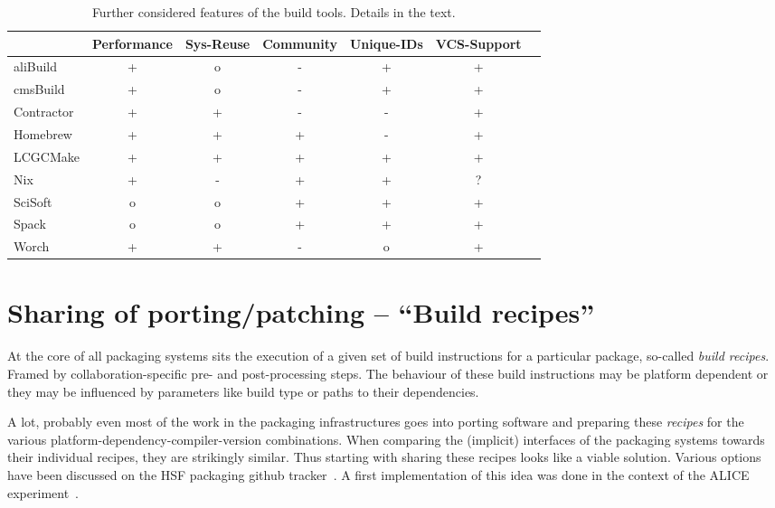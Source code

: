 \documentclass[12pt,a4paper]{article}
\begin{document}
\begin{table}
\centering
\begin{tabular}{lcccccc}

&Performance & Sys-Reuse & Community & Unique-IDs & VCS-Support\\ \hline
aliBuild & \cellcolor{green} + & \cellcolor{yellow} o & \cellcolor{red} - & \cellcolor{green} +& \cellcolor{green} +  \\
cmsBuild & \cellcolor{green} + & \cellcolor{yellow} o & \cellcolor{red} - & \cellcolor{green} +& \cellcolor{green} +  \\
Contractor & \cellcolor{green} + & \cellcolor{green} + & \cellcolor{red} - & \cellcolor{red} - & \cellcolor{green} + \\
Homebrew & \cellcolor{green} +  & \cellcolor{green} +  & \cellcolor{green} + & \cellcolor{red} - & \cellcolor{green} + \\
LCGCMake & \cellcolor{green} + & \cellcolor{green} + & \cellcolor{yellow} + & \cellcolor{green} + & \cellcolor{green} + \\
Nix & \cellcolor{green} + & \cellcolor{red} -  & \cellcolor{green} + & \cellcolor{green} + & ? \\
SciSoft & \cellcolor{yellow} o & \cellcolor{yellow} o & \cellcolor{green} + &  \cellcolor{green} + & \cellcolor{green}+  \\
Spack & \cellcolor{yellow} o & \cellcolor{yellow} o  & \cellcolor{green} + & \cellcolor{green} +& \cellcolor{green} +\\
Worch & \cellcolor{green} + &  \cellcolor{green} + & \cellcolor{red} -  & \cellcolor{yellow} o & \cellcolor{green} + 
\end{tabular}
\caption{\label{tab:taxonomyOthers}Further considered features of the build tools. Details in the text.}
\end{table}

\section{Sharing of porting/patching -- ``Build recipes''}
At the core of all packaging systems sits the execution of a given set of build instructions for a particular package, so-called \emph{build recipes}. Framed by collaboration-specific pre- and post-processing steps. The behaviour of these build instructions may be platform dependent or they may be influenced by parameters like build type or paths to their dependencies. 

A lot, probably even most of the work in the packaging infrastructures goes into porting software and preparing these \emph{recipes} for the various platform-dependency-compiler-version combinations. When comparing the (implicit) interfaces of the packaging systems towards their individual recipes, they are strikingly similar. Thus starting with sharing these recipes looks like a viable solution. Various options have been discussed on the HSF packaging github tracker~\cite{github:discussion}. A first implementation of this idea was done in the context of the ALICE experiment~\cite{alidist}.
\end{document}
